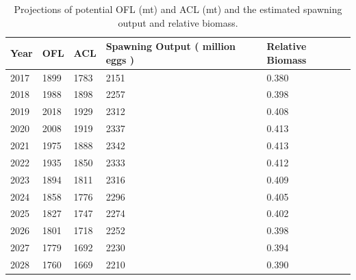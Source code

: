\documentclass[12pt,]{article}
\begin{document}
\begin{table}[ht]
\centering
\caption{Projections of potential OFL (mt) and ACL (mt) and the estimated spawning output and relative biomass.} 
\label{tab:OFL_projection}
\begin{tabular}{lllll}
  \hline
Year & OFL & ACL & Spawning Output ( million eggs ) & Relative Biomass \\ 
  \hline
2017 & 1899 & 1783 & 2151 & 0.380 \\ 
  2018 & 1988 & 1898 & 2257 & 0.398 \\ 
  2019 & 2018 & 1929 & 2312 & 0.408 \\ 
  2020 & 2008 & 1919 & 2337 & 0.413 \\ 
  2021 & 1975 & 1888 & 2342 & 0.413 \\ 
  2022 & 1935 & 1850 & 2333 & 0.412 \\ 
  2023 & 1894 & 1811 & 2316 & 0.409 \\ 
  2024 & 1858 & 1776 & 2296 & 0.405 \\ 
  2025 & 1827 & 1747 & 2274 & 0.402 \\ 
  2026 & 1801 & 1718 & 2252 & 0.398 \\ 
  2027 & 1779 & 1692 & 2230 & 0.394 \\ 
  2028 & 1760 & 1669 & 2210 & 0.390 \\ 
   \hline
\end{tabular}
\end{table}\begin{table}[ht]
\centering
\caption{Summary of 10-year 
                                             projections beginning in 2019 
                                             for alternate states of nature based on 
                                             an axis of uncertainty for the base model. 
                                             Columns range over low, mid, and high
                                             states of nature, and rows range over different 
                                             assumptions of catch levels. An entry of "--" 
                                             indicates that the stock is driven to very low 
                                             abundance under the particular scenario.} 
\label{tab:Decision_table_mod1}
\end{table}
\end{document}
